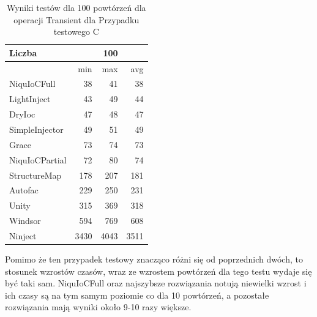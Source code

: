 \documentclass[12pt]{article}
\begin{document}
\begin{table}[H]
\captionsetup{belowskip=0pt,aboveskip=0pt}
\begin{center}
\begin{small}
	\begin{tabular}{ | l | r r r | }
    		\hline
Liczba & & 100 & \\ \hline
 & min & max & avg \\ \hline
NiquIoCFull & 38 & 41 & 38 \\ \hline
LightInject & 43 & 49 & 44 \\ \hline
DryIoc & 47 & 48 & 47 \\ \hline
SimpleInjector & 49 & 51 & 49 \\ \hline
Grace & 73 & 74 & 73 \\ \hline
NiquIoCPartial & 72 & 80 & 74 \\ \hline
StructureMap & 178 & 207 & 181 \\ \hline
Autofac & 229 & 250 & 231 \\ \hline
Unity & 315 & 369 & 318 \\ \hline
Windsor & 594 & 769 & 608 \\ \hline
Ninject & 3430 & 4043 & 3511 \\ \hline
  	\end{tabular}
\end{small}
\end{center}
\caption{Wyniki testów dla 100 powtórzeń dla operacji Transient dla Przypadku testowego C}
\label{TestCaseC_Transient100}
\end{table}
Pomimo że ten przypadek testowy znacząco różni się od poprzednich dwóch, to stosunek wzrostów czasów, wraz ze wzrostem powtórzeń dla tego testu wydaje się być taki sam. NiquIoCFull oraz najszybsze rozwiązania notują niewielki wzrost i ich czasy są na tym samym poziomie co dla 10 powtórzeń, a pozostałe rozwiązania mają wyniki około 9-10 razy większe.
\\ \\
\end{document}
